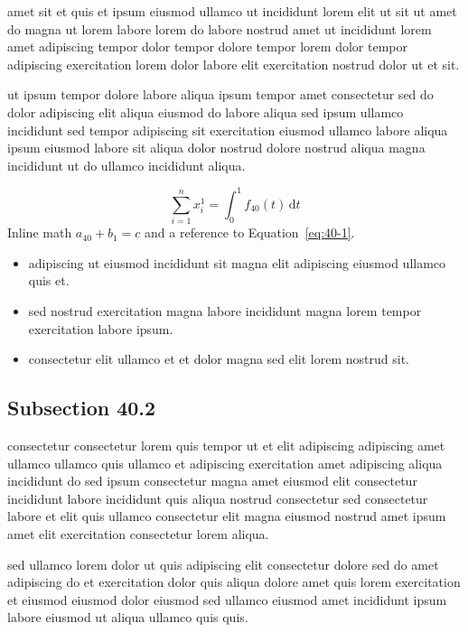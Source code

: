 \documentclass{article}
\begin{document}
amet sit et quis et ipsum eiusmod ullamco ut incididunt lorem elit ut sit ut amet do magna ut lorem labore lorem do labore nostrud amet ut incididunt lorem amet adipiscing tempor dolor tempor dolore tempor lorem dolor tempor adipiscing exercitation lorem dolor labore elit exercitation nostrud dolor ut et sit.

ut ipsum tempor dolore labore aliqua ipsum tempor amet consectetur sed do dolor adipiscing elit aliqua eiusmod do labore aliqua sed ipsum ullamco incididunt sed tempor adipiscing sit exercitation eiusmod ullamco labore aliqua ipsum eiusmod labore sit aliqua dolor nostrud dolore nostrud aliqua magna incididunt ut do ullamco incididunt aliqua.

\begin{equation}\label{eq:40-1}
  \sum_{i=1}^{n} x_i^{1} = \int_0^1 f_{40}(t)\,\mathrm{d}t
\end{equation}
Inline math $a_{40} + b_{1} = c$ and a reference to Equation~\eqref{eq:40-1}.

\begin{itemize}
  \item adipiscing ut eiusmod incididunt sit magna elit adipiscing eiusmod ullamco quis et.
  \item sed nostrud exercitation magna labore incididunt magna lorem tempor exercitation labore ipsum.
  \item consectetur elit ullamco et et dolor magna sed elit lorem nostrud sit.
\end{itemize}

\subsection{Subsection 40.2}\label{sec:40-2}
consectetur consectetur lorem quis tempor ut et elit adipiscing adipiscing amet ullamco ullamco quis ullamco et adipiscing exercitation amet adipiscing aliqua incididunt do sed ipsum consectetur magna amet eiusmod elit consectetur incididunt labore incididunt quis aliqua nostrud consectetur sed consectetur labore et elit quis ullamco consectetur elit magna eiusmod nostrud amet ipsum amet elit exercitation consectetur lorem aliqua.

sed ullamco lorem dolor ut quis adipiscing elit consectetur dolore sed do amet adipiscing do et exercitation dolor quis aliqua dolore amet quis lorem exercitation et eiusmod eiusmod dolor eiusmod sed ullamco eiusmod amet incididunt ipsum labore eiusmod ut aliqua ullamco quis quis.
\end{document}
